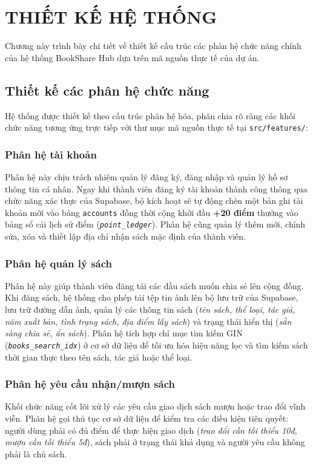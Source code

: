 
\section{THIẾT KẾ HỆ THỐNG}

Chương này trình bày chi tiết về thiết kế cấu trúc các phân hệ chức năng chính của hệ thống BookShare Hub dựa trên mã nguồn thực tế của dự án.

\subsection{Thiết kế các phân hệ chức năng}

Hệ thống được thiết kế theo cấu trúc phân hệ hóa, phân chia rõ ràng các khối chức năng tương ứng trực tiếp với thư mục mã nguồn thực tế tại \texttt{src/features/}:

\subsubsection{Phân hệ tài khoản}
Phân hệ này chịu trách nhiệm quản lý đăng ký, đăng nhập và quản lý hồ sơ thông tin cá nhân. Ngay khi thành viên đăng ký tài khoản thành công thông qua chức năng xác thực của Supabase, bộ kích hoạt sẽ tự động chèn một bản ghi tài khoản mới vào bảng \texttt{accounts} đồng thời cộng khởi đầu \textbf{+20 điểm} thưởng vào bảng sổ cái lịch sử điểm (\textit{\texttt{point\_ledger}}). Phân hệ cũng quản lý thêm mới, chỉnh sửa, xóa và thiết lập địa chỉ nhận sách mặc định của thành viên.

\subsubsection{Phân hệ quản lý sách}
Phân hệ này giúp thành viên đăng tải các đầu sách muốn chia sẻ lên cộng đồng. Khi đăng sách, hệ thống cho phép tải tệp tin ảnh lên bộ lưu trữ của Supabase, lưu trữ đường dẫn ảnh, quản lý các thông tin sách (\textit{tên sách, thể loại, tác giả, năm xuất bản, tình trạng sách, địa điểm lấy sách}) và trạng thái hiển thị (\textit{sẵn sàng chia sẻ, ẩn sách}). Phân hệ tích hợp chỉ mục tìm kiếm GIN (\textit{\texttt{books\_search\_idx}}) ở cơ sở dữ liệu để tối ưu hóa hiệu năng lọc và tìm kiếm sách thời gian thực theo tên sách, tác giả hoặc thể loại.

\subsubsection{Phân hệ yêu cầu nhận/mượn sách}
Khối chức năng cốt lõi xử lý các yêu cầu giao dịch sách mượn hoặc trao đổi vĩnh viễn. Phân hệ gọi thủ tục cơ sở dữ liệu để kiểm tra các điều kiện tiên quyết: người dùng phải có đủ điểm để thực hiện giao dịch (\textit{trao đổi cần tối thiểu 10đ, mượn cần tối thiểu 5đ}), sách phải ở trạng thái khả dụng và người yêu cầu không phải là chủ sách. 

